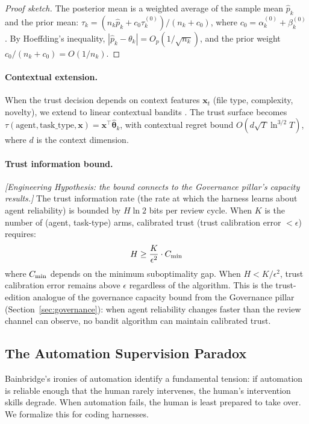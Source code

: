 \begin{proof}[Proof sketch]
The posterior mean is a weighted average of the sample mean $\hat{p}_k$ and the prior mean: $\tau_k = (n_k \hat{p}_k + c_0 \tau_k^{(0)}) / (n_k + c_0)$, where $c_0 = \alpha_k^{(0)} + \beta_k^{(0)}$. By Hoeffding's inequality, $|\hat{p}_k - \theta_k| = O_p(1/\sqrt{n_k})$, and the prior weight $c_0/(n_k + c_0) = O(1/n_k)$.
\end{proof}

\paragraph{Contextual extension.} When the trust decision depends on context features $\mathbf{x}_t$ (file type, complexity, novelty), we extend to linear contextual bandits \citep{li2010contextual, agrawal2013thompson}. The trust surface becomes $\tau(\text{agent}, \text{task\_type}, \mathbf{x}) = \mathbf{x}^\top \hat{\boldsymbol{\theta}}_k$, with contextual regret bound $O(d\sqrt{T} \ln^{3/2} T)$, where $d$ is the context dimension.

\paragraph{Trust information bound.} \emph{[Engineering Hypothesis: the bound connects to the Governance pillar's capacity results.]} The trust information rate (the rate at which the harness learns about agent reliability) is bounded by $H \ln 2$ bits per review cycle. When $K$ is the number of (agent, task-type) arms, calibrated trust (trust calibration error $< \epsilon$) requires:
\begin{equation}
H \geq \frac{K}{\epsilon^2} \cdot C_{\textup{min}}
\end{equation}
where $C_{\textup{min}}$ depends on the minimum suboptimality gap. When $H < K/\epsilon^2$, trust calibration error remains above $\epsilon$ regardless of the algorithm. This is the trust-edition analogue of the governance capacity bound from the Governance pillar (Section~\ref{sec:governance}): when agent reliability changes faster than the review channel can observe, no bandit algorithm can maintain calibrated trust.

\subsection{The Automation Supervision Paradox}

Bainbridge's \citeyearpar{bainbridge1983ironies} ironies of automation identify a fundamental tension: if automation is reliable enough that the human rarely intervenes, the human's intervention skills degrade. When automation fails, the human is least prepared to take over. We formalize this for coding harnesses.

